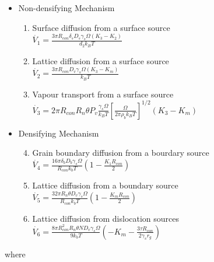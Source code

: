 \documentclass[11pt]{article} %
\begin{document}
\begin{figure}[ht]
\begin{Table}
	\begin{itemize}
	\item Non-densifying Mechanism
		\begin{enumerate}
		\item Surface diffusion from a surface source \\
	$\dot{V_{1}} = \frac{3 \pi R_{con} \delta_{s} D_{s}\gamma_{s} \Omega (K_{3}-K_{2})}{d_{2}k_{B}T}$
		\item Lattice diffusion from a surface source \\
	$\dot{V_{2}} = \frac{3 \pi R_{con} D_{v}\gamma_{s} \Omega (K_{3}-K_{m})}{k_{B}T}$
		\item Vapour transport from a surface source \\
	$\dot{V_{3}} = 2 \pi R_{con} R_{n} \theta P_{v} \frac{\gamma_{s} \Omega}{k_{B}T}\left[ \frac{\Omega}{2 \pi \rho_{b} k_{B}T} \right]^{1/2} (K_{3}-K_{m})$
		\end{enumerate}
	\item Densifying Mechanism
		\begin{enumerate}
		\setcounter{enumi}{3}
		\item Grain boundary diffusion from a bourdary source \\
	$\dot{V_{4}} = \frac{16\pi \delta_{b} D_{b}\gamma_{s}\Omega}{R_{con}k_{b}T}\left(1-\frac{K_{1}R_{con}}{2}\right)$
		\item Lattice diffusion from a boundary source \\
	$\dot{V_{5}} = \frac{32\pi R_{n} \theta D_{v}\gamma_{s}\Omega}{R_{con}k_{b}T}\left(1-\frac{K_{m}R_{con}}{2}\right)$
		\item Lattice diffusion from dislocation sources \\
	$\dot{V_{6}} = \frac{8\pi R_{con}^{2} R_{n} \theta N D_{v}\gamma_{s}\Omega}{9 k_{b}T}\left(-K_{m}-\frac{3 \tau R_{con}}{2 \gamma_{s} r_{g}}\right)$
		\end{enumerate}
	\end{itemize}
	
	where
	

\end{Table}
\end{figure}
\end{document}
